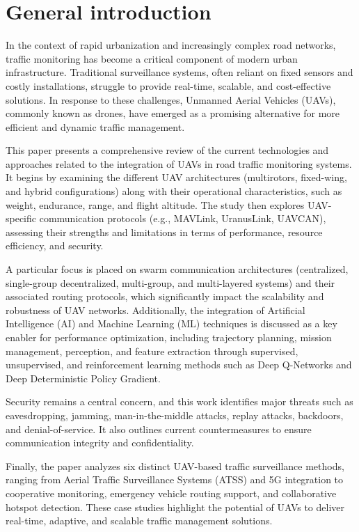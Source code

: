 \chapter*{General introduction}
\label{chap.intro}

In the context of rapid urbanization and increasingly complex road networks, traffic monitoring has become a critical component of modern urban infrastructure. Traditional surveillance systems, often reliant on fixed sensors and costly installations, struggle to provide real-time, scalable, and cost-effective solutions. In response to these challenges, Unmanned Aerial Vehicles (UAVs), commonly known as drones, have emerged as a promising alternative for more efficient and dynamic traffic management.

This paper presents a comprehensive review of the current technologies and approaches related to the integration of UAVs in road traffic monitoring systems. It begins by examining the different UAV architectures (multirotors, fixed-wing, and hybrid configurations) along with their operational characteristics, such as weight, endurance, range, and flight altitude. The study then explores UAV-specific communication protocols (e.g., MAVLink, UranusLink, UAVCAN), assessing their strengths and limitations in terms of performance, resource efficiency, and security.

A particular focus is placed on swarm communication architectures (centralized, single-group decentralized, multi-group, and multi-layered systems) and their associated routing protocols, which significantly impact the scalability and robustness of UAV networks. Additionally, the integration of Artificial Intelligence (AI) and Machine Learning (ML) techniques is discussed as a key enabler for performance optimization, including trajectory planning, mission management, perception, and feature extraction through supervised, unsupervised, and reinforcement learning methods such as Deep Q-Networks and Deep Deterministic Policy Gradient.

Security remains a central concern, and this work identifies major threats such as eavesdropping, jamming, man-in-the-middle attacks, replay attacks, backdoors, and denial-of-service. It also outlines current countermeasures to ensure communication integrity and confidentiality.

Finally, the paper analyzes six distinct UAV-based traffic surveillance methods, ranging from Aerial Traffic Surveillance Systems (ATSS) and 5G integration to cooperative monitoring, emergency vehicle routing support, and collaborative hotspot detection. These case studies highlight the potential of UAVs to deliver real-time, adaptive, and scalable traffic management solutions.

